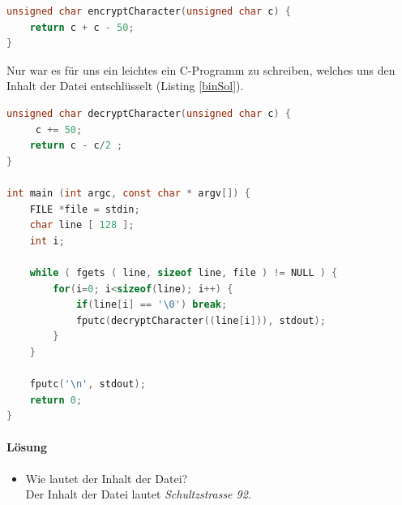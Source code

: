 \documentclass[12pt]{article}
\begin{document}
\begin{lstlisting}[language=C, caption={C-Code der Methode encryptCharacter},label=binEncC2,basicstyle=\footnotesize]
unsigned char encryptCharacter(unsigned char c) {
    return c + c - 50;
}
\end{lstlisting}
Nur war es für uns ein leichtes ein C-Programm zu schreiben, welches uns den Inhalt der Datei entschlüsselt (Listing \ref{binSol}).
\begin{lstlisting}[language=C, caption={Entschlüsselungsprogramm in C},label=binSol,basicstyle=\footnotesize]
unsigned char decryptCharacter(unsigned char c) { 
     c += 50; 
    return c - c/2 ; 
}

int main (int argc, const char * argv[]) {
    FILE *file = stdin;
    char line [ 128 ];  
    int i;
    
    while ( fgets ( line, sizeof line, file ) != NULL ) {
        for(i=0; i<sizeof(line); i++) {
            if(line[i] == '\0') break;
            fputc(decryptCharacter((line[i])), stdout);
        }
    }
  
    fputc('\n', stdout);
    return 0;
}
\end{lstlisting}


\paragraph{Lösung}
\begin{itemize}
	\item Wie lautet der Inhalt der Datei?\\
		Der Inhalt der Datei lautet \textit{Schultzstrasse 92}.
\end{itemize}
\end{document}
